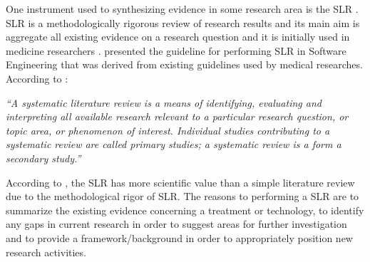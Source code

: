 One instrument used to synthesizing evidence in some research area is the \acrfull{SLR} \cite{Petersen2015}. \acrshort{SLR} is a methodologically rigorous review of research results and its main aim is aggregate all existing evidence on a research question and it is initially used in medicine researchers \cite{Kitchenham2009}. \citet{Kitchenham2004} presented the guideline for performing \acrshort{SLR} in Software Engineering that was derived from existing guidelines used by medical researches. According to \citet{Kitchenham2004}:

\textit{``A systematic literature review is a means of identifying, evaluating and interpreting all available research relevant to a particular research question, or topic area, or phenomenon of interest. Individual studies contributing to a systematic review are called primary studies; a systematic review is a form a secondary study.''}

According to \citet{Kitchenham2004}, the \acrshort{SLR} has more scientific value than a simple literature review due to the methodological rigor of \acrshort{SLR}. The reasons to performing a \acrshort{SLR} are to summarize the existing evidence concerning a treatment or technology, to identify any gaps in current research in order to suggest areas for further investigation and to provide a framework/background in order to appropriately position new research activities. 